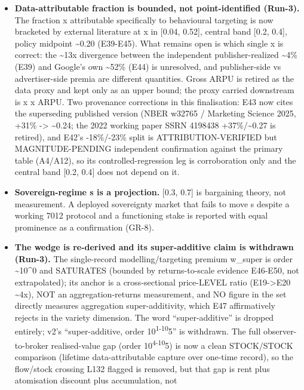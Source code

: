 \documentclass[
  11pt,
]{article}
\providecommand{\tightlist}{%
  \setlength{\itemsep}{0pt}\setlength{\parskip}{0pt}}
\begin{document}
\begin{itemize}
\tightlist
\item
  \textbf{Data-attributable fraction is bounded, not point-identified
  (Run-3).} The fraction x attributable specifically to behavioural
  targeting is now bracketed by external literature at x in {[}0.04,
  0.52{]}, central band {[}0.2, 0.4{]}, policy midpoint
  \textasciitilde0.20 (E39-E45). What remains open is which single x is
  correct: the \textasciitilde13x divergence between the independent
  publisher-realized \textasciitilde4\% (E39) and Google's own
  \textasciitilde52\% (E44) is unresolved, and publisher-side vs
  advertiser-side premia are different quantities. Gross ARPU is retired
  as the data proxy and kept only as an upper bound; the proxy carried
  downstream is x x ARPU. Two provenance corrections in this
  finalisation: E43 now cites the superseding published version (NBER
  w32765 / Marketing Science 2025, +31\% -\textgreater{}
  \textasciitilde0.24; the 2022 working paper SSRN 4198438
  +37\%/\textasciitilde0.27 is retired), and E42's -18\%/-23\% split is
  ATTRIBUTION-VERIFIED but MAGNITUDE-PENDING independent confirmation
  against the primary table (A4/A12), so its controlled-regression leg
  is corroboration only and the central band {[}0.2, 0.4{]} does not
  depend on it.
\item
  \textbf{Sovereign-regime s is a projection.} {[}0.3, 0.7{]} is
  bargaining theory, not measurement. A deployed sovereignty market that
  fails to move s despite a working 7012 protocol and a functioning
  stake is reported with equal prominence as a confirmation (GR-8).
\item
  \textbf{The wedge is re-derived and its super-additive claim is
  withdrawn (Run-3).} The single-record modelling/targeting premium
  w\_super is order \textasciitilde10\^{}0 and SATURATES (bounded by
  returns-to-scale evidence E46-E50, not extrapolated); its anchor is a
  cross-sectional price-LEVEL ratio (E19-\textgreater E20
  \textasciitilde4x), NOT an aggregation-returns measurement, and NO
  figure in the set directly measures aggregation super-additivity,
  which E47 affirmatively rejects in the variety dimension. The word
  ``super-additive'' is dropped entirely; v2's ``super-additive, order
  10\textsuperscript{1-10}5'' is withdrawn. The full observer-to-broker
  realised-value gap (order 10\textsuperscript{4-10}5) is now a clean
  STOCK/STOCK comparison (lifetime data-attributable capture over
  one-time record), so the flow/stock crossing L132 flagged is removed,
  but that gap is rent plus atomisation discount plus accumulation, not

\end{itemize}
\end{document}
